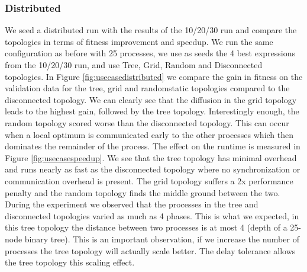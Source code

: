 \subsubsection{Distributed}
We seed a distributed run with the results of the 10/20/30 run and compare the topologies in terms of fitness improvement and speedup.
We run the same configuration as before with 25 processes, we use as seeds the 4 best expressions from the 10/20/30 run, and use Tree, Grid, Random and Disconnected topologies.
In Figure \ref{fig:usecasedistributed} we compare the gain in fitness on the validation data for the tree, grid and randomstatic topologies compared to the disconnected topology. We can clearly see that the diffusion in the grid topology leads to the highest gain, followed by the tree topology. Interestingly enough, the random topology scored worse than the disconnected topology. This can occur when a local optimum is communicated early to the other processes which then dominates the remainder of the process. The effect on the runtime is measured in Figure \ref{fig:usecasespeedup}. We see that the tree topology has minimal overhead and runs nearly as fast as the disconnected topology where no synchronization or communication overhead is present. The grid topology suffers a 2x performance penalty and the random topology finds the middle ground between the two. During the experiment we observed that the processes in the tree and disconnected topologies varied as much as 4 phases. This is what we expected, in this tree topology the distance between two processes is at most 4 (depth of a 25-node binary tree). This is an important observation, if we increase the number of processes the tree topology will actually scale better. The delay tolerance allows the tree topology this scaling effect.
